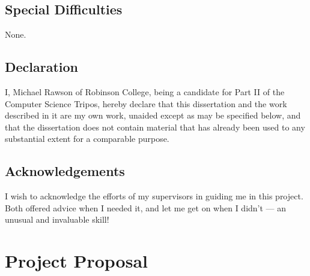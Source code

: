 \documentclass[12pt,a4paper,twoside,openright]{report}
\begin{document}
\section*{Special Difficulties}
None.

\newpage
\section*{Declaration}
I, Michael Rawson of Robinson College, being a candidate for Part II of the Computer Science Tripos, hereby declare that this dissertation and the work described in it are my own work, unaided except as may be specified below, and that the dissertation does not contain material that has already been used to any substantial extent for a comparable purpose.

\bigskip
{}
\medskip
{}
\tableofcontents

\newpage
\section*{Acknowledgements}
I wish to acknowledge the efforts of my supervisors in guiding me in this project.
Both offered advice when I needed it, and let me get on when I didn't --- an unusual and invaluable skill!

\pagestyle{headings}






\printbibliography
\appendix
\chapter{Project Proposal}

\end{document}
